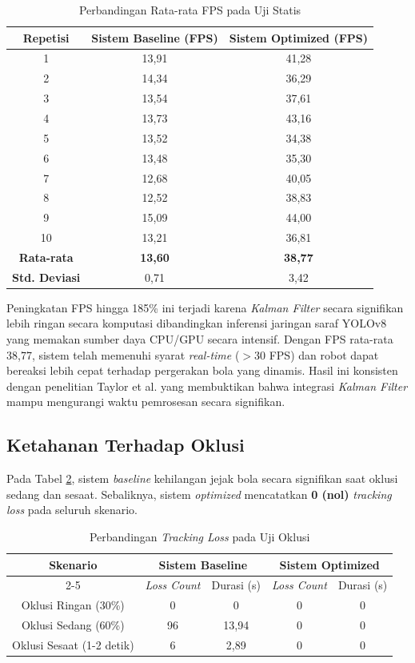 \documentclass[12pt,a4paper]{article}
\begin{document}
\begin{table}[H]
\centering
\caption{Perbandingan Rata-rata FPS pada Uji Statis}
\label{tab:fps}
\begin{tabular}{|c|c|c|}
\hline
\textbf{Repetisi} & \textbf{Sistem Baseline (FPS)} & \textbf{Sistem Optimized (FPS)} \\
\hline
1 & 13,91 & 41,28 \\
2 & 14,34 & 36,29 \\
3 & 13,54 & 37,61 \\
4 & 13,73 & 43,16 \\
5 & 13,52 & 34,38 \\
6 & 13,48 & 35,30 \\
7 & 12,68 & 40,05 \\
8 & 12,52 & 38,83 \\
9 & 15,09 & 44,00 \\
10 & 13,21 & 36,81 \\
\hline
\textbf{Rata-rata} & \textbf{13,60} & \textbf{38,77} \\
\textbf{Std. Deviasi} & 0,71 & 3,42 \\
\hline
\end{tabular}
\end{table}

Peningkatan FPS hingga 185\% ini terjadi karena \textit{Kalman Filter} secara signifikan lebih ringan secara komputasi dibandingkan inferensi jaringan saraf YOLOv8 yang memakan sumber daya CPU/GPU secara intensif. Dengan FPS rata-rata 38,77, sistem telah memenuhi syarat \textit{real-time} ($>$30 FPS) dan robot dapat bereaksi lebih cepat terhadap pergerakan bola yang dinamis. Hasil ini konsisten dengan penelitian Taylor et al. \cite{Taylor2016} yang membuktikan bahwa integrasi \textit{Kalman Filter} mampu mengurangi waktu pemrosesan secara signifikan.

\subsection{Ketahanan Terhadap Oklusi}
Pada Tabel \ref{tab:oklusi}, sistem \textit{baseline} kehilangan jejak bola secara signifikan saat oklusi sedang dan sesaat. Sebaliknya, sistem \textit{optimized} mencatatkan \textbf{0 (nol)} \textit{tracking loss} pada seluruh skenario.

\begin{table}[H]
\centering
\caption{Perbandingan \textit{Tracking Loss} pada Uji Oklusi}
\label{tab:oklusi}
\begin{tabular}{|c|c|c|c|c|}
\hline
\multirow{2}{*}{\textbf{Skenario}} & \multicolumn{2}{c|}{\textbf{Sistem Baseline}} & \multicolumn{2}{c|}{\textbf{Sistem Optimized}} \\
\cline{2-5}
& \textit{Loss Count} & Durasi (s) & \textit{Loss Count} & Durasi (s) \\
\hline
Oklusi Ringan (30\%) & 0 & 0 & 0 & 0 \\
Oklusi Sedang (60\%) & 96 & 13,94 & 0 & 0 \\
Oklusi Sesaat (1-2 detik) & 6 & 2,89 & 0 & 0 \\
\hline
\end{tabular}
\end{table}
\end{document}
